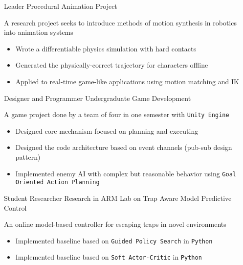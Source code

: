 \documentclass[10pt, a4paper, sans]{moderncv}
\begin{document}
{Leader}
{Procedural Animation Project}
{}{}
{
	A research project seeks to introduce methods of motion synthesis in robotics into animation systems
	\begin{itemize}
		\item Wrote a differentiable physics simulation with hard contacts
		\item Generated the physically-correct trajectory for characters offline
		\item Applied to real-time game-like applications using motion matching and IK
	\end{itemize}
}

{Designer and Programmer}
{Undergraduate Game Development}
{}{}
{A game project done by a team of four in one semester with \texttt{Unity Engine}
	\begin{itemize}
		\item Designed core mechanism focused on planning and executing
		\item Designed the code architecture based on event channels (pub-sub design pattern)
		\item Implemented enemy AI with complex but reasonable behavior using \texttt{Goal Oriented Action Planning}
	\end{itemize}
}

{Student Researcher}
{Research in ARM Lab on Trap Aware Model Predictive Control}
{}{}
{
	An online model-based controller for escaping traps in novel environments
	\begin{itemize}
		\item Implemented baseline based on \texttt{Guided Policy Search} in \texttt{Python}
		\item Implemented baseline based on \texttt{Soft Actor-Critic} in \texttt{Python}
	\end{itemize}
}

\end{document}

